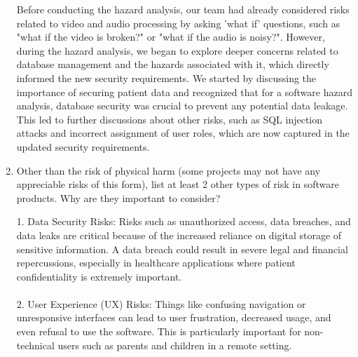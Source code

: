 \documentclass{article}
\begin{document}
\begin{enumerate}
    \hspace{1.5em} Before conducting the hazard analysis, our team had already considered risks 
    related to video and audio processing by asking 'what if' questions, such 
    as "what if the video is broken?" or "what if the audio is noisy?". However, 
    during the hazard analysis, we began to explore deeper concerns related to database 
    management and the hazards associated with it, which directly informed the new security 
    requirements. We started by discussing the importance of securing patient data and 
    recognized that for a software hazard analysis, database security was crucial to 
    prevent any potential data leakage. This led to further discussions about other risks, 
    such as SQL injection attacks and incorrect assignment of user roles, which are now 
    captured in the updated security requirements.\\


    \item Other than the risk of physical harm (some projects may not have any
    appreciable risks of this form), list at least 2 other types of risk in
    software products. Why are they important to consider?

    1. Data Security Risks: Risks such as unauthorized access, data breaches, and data leaks are critical because of the 
    increased reliance on digital storage of sensitive information. A data breach could result in severe legal and 
    financial repercussions, especially in healthcare applications where patient confidentiality is extremely important. \\\\
	  2. User Experience (UX) Risks: Things like confusing navigation or unresponsive interfaces can lead to user 
    frustration, decreased usage, and even refusal to use the software. This is particularly important for non-technical 
    users such as parents and children in a remote setting.

\end{enumerate}
\end{document}
